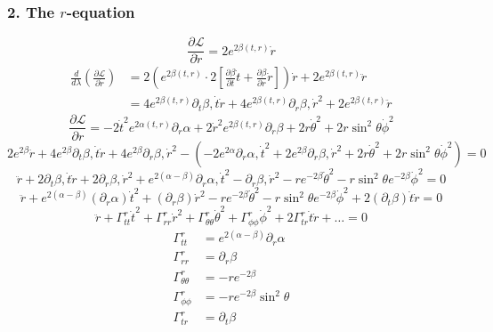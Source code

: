 \documentclass[11pt, a4paper]{report}
\begin{document}
\subsubsection*{2. The $r$-equation}
\begin{equation}
\frac{\partial \mathcal{L}}{\partial \dot{r}} = 2e^{2\beta(t,r)} \dot{r}
\end{equation}
\begin{align}
\frac{d}{d\lambda} \left( \frac{\partial \mathcal{L}}{\partial \dot{r}} \right) &= 2 \left( e^{2\beta(t,r)} \cdot 2 \left[ \frac{\partial \beta}{\partial t} \dot{t} + \frac{\partial \beta}{\partial r} \dot{r} \right] \right) \dot{r} + 2e^{2\beta(t,r)} \ddot{r} \nonumber \\
&= 4e^{2\beta(t,r)} \partial_t \beta , \dot{t}\dot{r} + 4e^{2\beta(t,r)} \partial_r \beta , \dot{r}^2 + 2e^{2\beta(t,r)} \ddot{r}
\end{align}
\begin{equation}
\frac{\partial \mathcal{L}}{\partial r} = -2\dot{t}^2 e^{2\alpha(t,r)} \partial_r \alpha + 2\dot{r}^2 e^{2\beta(t,r)} \partial_r \beta + 2r\dot{\theta}^2 + 2r\sin^2\theta \dot{\phi}^2
\end{equation}
\begin{equation}
2e^{2\beta} \ddot{r} + 4e^{2\beta} \partial_t \beta , \dot{t}\dot{r} + 4e^{2\beta} \partial_r \beta , \dot{r}^2 - \left( -2e^{2\alpha} \partial_r \alpha , \dot{t}^2 + 2e^{2\beta} \partial_r \beta , \dot{r}^2 + 2r\dot{\theta}^2 + 2r\sin^2\theta \dot{\phi}^2 \right) = 0
\end{equation}
\begin{equation}
\ddot{r} + 2\partial_t \beta , \dot{t}\dot{r} + 2\partial_r \beta , \dot{r}^2 + e^{2(\alpha - \beta)} \partial_r \alpha , \dot{t}^2 - \partial_r \beta , \dot{r}^2 - r e^{-2\beta} \dot{\theta}^2 - r \sin^2\theta e^{-2\beta} \dot{\phi}^2 = 0
\end{equation}
\begin{equation}
\ddot{r} + e^{2(\alpha - \beta)} (\partial_r \alpha) \dot{t}^2 + (\partial_r \beta) \dot{r}^2 - r e^{-2\beta} \dot{\theta}^2 - r \sin^2\theta e^{-2\beta} \dot{\phi}^2 + 2 (\partial_t \beta) \dot{t}\dot{r} = 0 \label{eq:geo_r}
\end{equation}
\begin{equation}
\ddot{r} + \Gamma^r_{tt}\dot{t}^2 + \Gamma^r_{rr}\dot{r}^2 + \Gamma^r_{\theta\theta}\dot{\theta}^2 + \Gamma^r_{\phi\phi}\dot{\phi}^2 + 2\Gamma^r_{tr}\dot{t}\dot{r} + \dots = 0
\end{equation}
\begin{align}
\Gamma^r_{tt} &= e^{2(\alpha - \beta)} \partial_r \alpha \\
\Gamma^r_{rr} &= \partial_r \beta \\
\Gamma^r_{\theta\theta} &= -r e^{-2\beta} \\
\Gamma^r_{\phi\phi} &= -r e^{-2\beta} \sin^2\theta \\
\Gamma^r_{tr} &= \partial_t \beta
\end{align}
\end{document}
